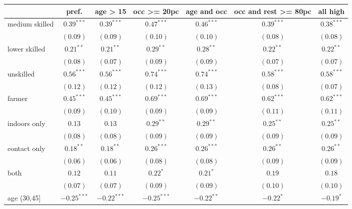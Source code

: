 
\begin{table}[h!]
\begin{center}
\begin{small}
\begin{tabular}{l c c c c c c}
\hline
 & pref. & age > 15 & occ >= 20pc & age and occ & occ and rest >= 80pc & all high \\
\hline
medium skilled & $0.39^{***}$  & $0.39^{***}$  & $0.47^{***}$  & $0.46^{***}$  & $0.39^{***}$  & $0.38^{***}$  \\
               & $(0.09)$      & $(0.09)$      & $(0.10)$      & $(0.10)$      & $(0.08)$      & $(0.08)$      \\
lower skilled  & $0.21^{**}$   & $0.21^{**}$   & $0.29^{**}$   & $0.28^{**}$   & $0.22^{**}$   & $0.22^{**}$   \\
               & $(0.08)$      & $(0.07)$      & $(0.09)$      & $(0.09)$      & $(0.07)$      & $(0.07)$      \\
unskilled      & $0.56^{***}$  & $0.56^{***}$  & $0.74^{***}$  & $0.74^{***}$  & $0.58^{***}$  & $0.58^{***}$  \\
               & $(0.12)$      & $(0.12)$      & $(0.12)$      & $(0.13)$      & $(0.08)$      & $(0.07)$      \\
farmer         & $0.45^{***}$  & $0.45^{***}$  & $0.69^{***}$  & $0.69^{***}$  & $0.62^{***}$  & $0.62^{***}$  \\
               & $(0.09)$      & $(0.10)$      & $(0.09)$      & $(0.09)$      & $(0.11)$      & $(0.11)$      \\
indoors only   & $0.13$        & $0.13$        & $0.29^{**}$   & $0.29^{**}$   & $0.25^{**}$   & $0.25^{**}$   \\
               & $(0.08)$      & $(0.08)$      & $(0.09)$      & $(0.09)$      & $(0.09)$      & $(0.09)$      \\
contact only   & $0.18^{**}$   & $0.18^{**}$   & $0.26^{***}$  & $0.26^{***}$  & $0.26^{**}$   & $0.26^{**}$   \\
               & $(0.06)$      & $(0.06)$      & $(0.08)$      & $(0.08)$      & $(0.09)$      & $(0.09)$      \\
both           & $0.12$        & $0.11$        & $0.22^{*}$    & $0.21^{*}$    & $0.19$        & $0.18$        \\
               & $(0.07)$      & $(0.07)$      & $(0.09)$      & $(0.09)$      & $(0.10)$      & $(0.10)$      \\
age (30,45]    & $-0.25^{***}$ & $-0.22^{***}$ & $-0.25^{***}$ & $-0.22^{**}$  & $-0.22^{*}$   & $-0.19^{*}$   \\

\end{tabular}
\end{small}
\end{center}
\end{table}
